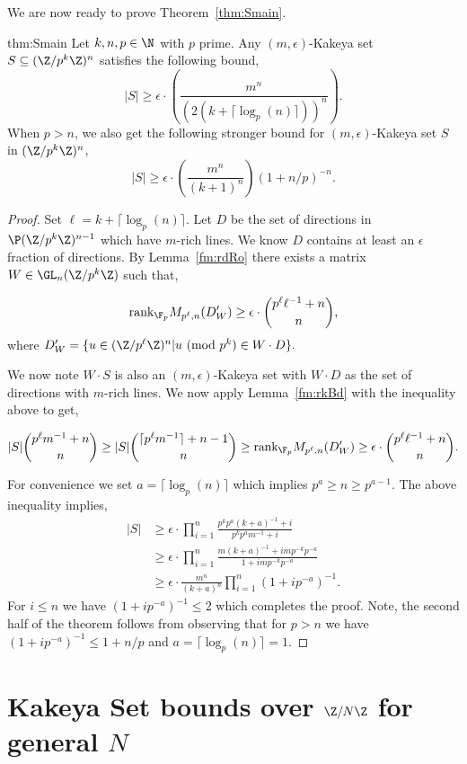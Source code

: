 We are now ready to prove Theorem~\ref{thm:Smain}.

\begin{repthm}{thm:Smain}
Let $k,n,p\in \N$ with $p$ prime. Any $(m,\epsilon)$-Kakeya set $S\subseteq (\Z/p^k\Z)^n$ satisfies the following bound,
$$|S| \ge \epsilon\cdot\left(\frac{m^n}{(2(k+\lceil\log_p(n)\rceil))^n}\right).$$
When $p>n$, we also get the following stronger bound for $(m,\epsilon)$-Kakeya set $S$ in $(\Z/p^k\Z)^n$,
$$|S|\ge \epsilon\cdot\left(\frac{m^n}{(k+1)^n}\right) (1+n/p)^{-n}.$$
\end{repthm}
\begin{proof}
Set $\ell = k+\lceil \log_p(n)\rceil$. Let $D$ be the set of directions in $\P (\Z/p^k\Z)^{n-1}$ which have $m$-rich lines. We know $D$ contains at least an $\epsilon$ fraction of directions. By Lemma~\ref{fm:rdRo} there exists a matrix $W\in \GL_n(\Z/p^k\Z)$ such that,

$$\text{rank}_{\F_p} M_{p^\ell,n}(D'_W)\ge \epsilon \cdot \binom{p^\ell \ell^{-1}+n}{n},$$
where $D'_W=\{u\in (\Z/p^\ell\Z)^{n}| u\text{ (mod }p^k\text{)}\in W \cdot D\}.$

We now note $W\cdot S$ is also an $(m,\epsilon)$-Kakeya set with $W\cdot D$ as the set of directions with $m$-rich lines. We now apply Lemma~\ref{fm:rkBd} with the inequality above to get,

$$|S|\binom{p^\ell m^{-1}+n}{n}\ge |S|\binom{\lceil p^\ell m^{-1}\rceil+n-1}{n}\ge \text{rank}_{\F_p} M_{p^\ell,n}(D'_W) \ge \epsilon \cdot \binom{p^\ell \ell^{-1} +n}{n}.$$

For convenience we set $a=\lceil \log_p(n)\rceil$ which implies $p^{a}\ge n\ge p^{a-1}$. The above inequality implies,
\begin{align*}
    |S| &\ge \epsilon \cdot \prod\limits_{i=1}^n \frac{p^k p^{a} (k+a)^{-1} +i}{p^k p^{a} m^{-1}+i}\\
    &\ge \epsilon \cdot \prod\limits_{i=1}^n \frac{ m(k+a)^{-1} +i m p^{-k} p^{-a}}{1+i m p^{-k} p^{-a}}\\
    &\ge \epsilon \cdot \frac{m^n}{(k+a)^{n}} \prod\limits_{i=1}^n\left(1+i p^{-a} \right)^{-1}.
\end{align*}
For $i\le n$ we have $\left(1+i p^{-a} \right)^{-1}\le 2$ which completes the proof. Note, the second half of the theorem follows from observing that for $p>n$ we have $\left(1+i p^{-a} \right)^{-1}\le 1+n/p$ and $a=\lceil\log_p(n)\rceil=1$.
\end{proof}

\section{Kakeya Set bounds over $\Z/N\Z$ for general $N$}\label{sec:Nbd}

